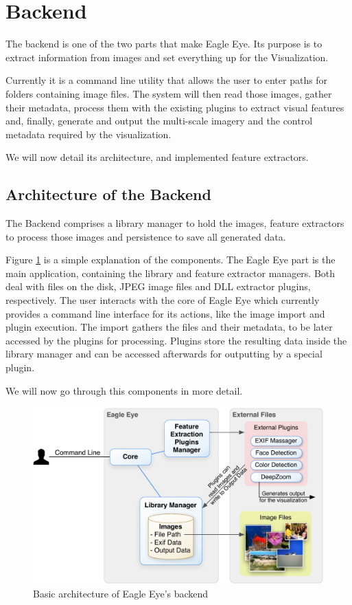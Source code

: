 \section{Backend} %
\label{sub:backend}

The backend is one of the two parts that make Eagle Eye. Its purpose is to extract information from images and set everything up for the Visualization.

Currently it is a command line utility that allows the user to enter paths for folders containing image files. The system will then read those images, gather their metadata, process them with the existing plugins to extract visual features and, finally, generate and output the multi-scale imagery and the control metadata required by the visualization.

We will now detail its architecture, and implemented feature extractors.

\subsection{Architecture of the Backend}

The Backend comprises a library manager to hold the images, feature extractors to process those images and persistence to save all generated data.

Figure \ref{fig:arch} is a simple explanation of the components. The Eagle Eye part is the main application, containing the library and feature extractor managers. Both deal with files on the disk, JPEG image files and DLL extractor plugins, respectively. The user interacts with the core of Eagle Eye which currently provides a command line interface for its actions, like the image import and plugin execution. The import gathers the files and their metadata, to be later accessed by the plugins for processing. Plugins store the resulting data inside the library manager and can be accessed afterwards for outputting by a special plugin.

We will now go through this components in more detail. 

\begin{figure}[ht]
	\centering
		\includegraphics[scale=0.7]{Figures/Architecture_v2.pdf}
	\caption{Basic architecture of Eagle Eye's backend}
	\label{fig:arch}
\end{figure}



